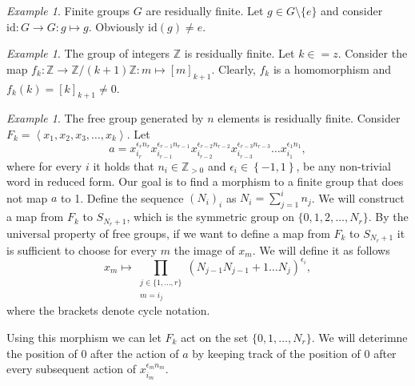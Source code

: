 \documentclass[titlepage, a4paper]{article}
\newcommand{\Z}{\mathbb{Z}}
\newcommand{\id}{\mathrm{id}}
\theoremstyle{remark}
\newtheorem{example}[theorem]{Example}
\begin{document}
\begin{example}
	Finite groups $G$ are residually finite. Let $g \in G \setminus \{e\}$ and consider $\id: G \to G: g \mapsto g$. Obviously $\id(g) \neq e$.
\end{example}


\begin{example}
	The group of integers $\mathbb Z$ is residually finite. Let $k \in \mathbb =z$. Consider the map $f_k: \mathbb Z \to \mathbb Z/(k+1)\mathbb Z: m \mapsto [m]_{k+1}$. Clearly, $f_k$ is a homomorphism and $f_k(k) = [k]_{k+1} \neq 0$.
\end{example}

\begin{example}\label{ex:free_group_residually_finite}
	The free group generated by $n$ elements is residually finite. 
	Consider $F_k = \left<x_1, x_2, x_3, \ldots, x_k \right>$.  %
Let \[
a = x_{i_r}^{\epsilon_r n_r}x_{i_{r-1}}^{\epsilon_{r-1}n_{r-1}}x_{i_{r-2}}^{\epsilon_{r-2}n_{r-2}}x_{i_{r-3}}^{\epsilon_{r-3}n_{r-3}} \ldots x_{i_1}^{\epsilon_1n_1}
,\]
where for every $i$ it holds that $n_i \in \Z_{>0}$ and $\epsilon_i \in \left\{ -1,1 \right\} $, be any non-trivial word in reduced form. 
Our goal is to find a morphism to a finite group that does not map $a$ to 1. 
Define the sequence $(N_i)_i$ as $N_i = \sum_{j = 1}^{i} n_j$. 
We will construct a map from $F_k$ to $S_{N_r + 1}$, which is the symmetric group on $\{0,1, 2, \ldots, N_{r}\} $.   %
By the universal property of free groups, if we want to define a map from $F_k$ to $S_{N_r +1}$ it is sufficient to choose for every $m$ the image of $x_m$.
We will define it as follows
\[
x_m \mapsto \prod_{\substack{j \in \{1,\ldots, r\} \\ m = i_j} } (N_{j-1} N_{j-1}+1 \ldots N_{j})^{\epsilon_i} %
,\] 
where the brackets denote cycle notation.

Using this morphism we can let $F_k$ act on the set $\{0,1,\ldots, N_r\} $. 
We will deterimne the position of $0$ after the action of $a$ by keeping track of the position of $0$ after every subsequent  action of  $x_{i_m}^{\epsilon_m n_m}$.


\end{example}
\end{document}

